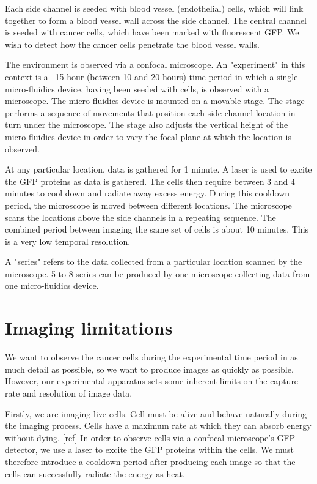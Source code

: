 Each side channel is seeded with blood vessel (endothelial) cells, which will link together to form a blood vessel wall across the side channel. The central channel is seeded with cancer cells, which have been marked with fluorescent GFP. We wish to detect how the cancer cells penetrate the blood vessel walls.

The environment is observed via a confocal microscope. An "experiment" in this context is a ~15-hour (between 10 and 20 hours) time period in which a single micro-fluidics device, having been seeded with cells, is observed with a microscope. The micro-fluidics device is mounted on a movable stage. The stage performs a sequence of movements that position each side channel location in turn under the microscope. The stage also adjusts the vertical height of the micro-fluidics device in order to vary the focal plane at which the location is observed.

At any particular location, data is gathered for 1 minute. A laser is used to excite the GFP proteins as data is gathered. The cells then require between 3 and 4 minutes to cool down and radiate away excess energy. During this cooldown period, the microscope is moved between different locations. The microscope scans the locations above the side channels in a repeating sequence. The combined period between imaging the same set of cells is about 10 minutes. This is a very low temporal resolution.

A "series" refers to the data collected from a particular location scanned by the microscope. 5 to 8 series can be produced by one microscope collecting data from one micro-fluidics device.

\section{Imaging limitations}

We want to observe the cancer cells during the experimental time period in as much detail as possible, so we want to produce images as quickly as possible. However, our experimental apparatus sets some inherent limits on the capture rate and resolution of image data.

Firstly, we are imaging live cells. Cell must be alive and behave naturally during the imaging process. Cells have a maximum rate at which they can absorb energy without dying. [ref] In order to observe cells via a confocal microscope's GFP detector, we use a laser to excite the GFP proteins within the cells. We must therefore introduce a cooldown period after producing each image so that the cells can successfully radiate the energy as heat.

